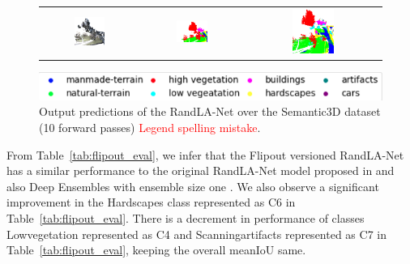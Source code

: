 \begin{figure}[h!]
\begin{tabular}{ccc}
            \includegraphics[width=0.33\textwidth, height=0.18\textheight]{images/seg_output/sem3d_seg_output/3_RGB.png} &
            \includegraphics[width=0.33\textwidth, height=0.18\textheight]{images/seg_output/sem3d_seg_output/3_GT.png}& 
            \includegraphics[width=0.33\textwidth, height=0.18\textheight]{images/seg_output/flipout/sem3d_3.png}\\
        \end{tabular}
        \includegraphics[scale=0.65]{images/legend.png}
        \caption{Output predictions of the RandLA-Net over the Semantic3D dataset (10 forward passes) \textcolor{red}{Legend spelling mistake}.}
        \label{fig:flipout_vis_sem3d}
    \end{figure}   

    From Table~\ref{tab:flipout_eval}, we infer that the Flipout versioned RandLA-Net has a similar performance to the original RandLA-Net model proposed in \cite{Hu_2020_CVPR_Randla} and also Deep Ensembles with ensemble size one .
    We also observe a significant improvement in the Hardscapes class represented as C6 in Table~\ref{tab:flipout_eval}.
    There is a decrement in performance of classes Lowvegetation represented as C4 and Scanningartifacts represented as C7 in Table~\ref{tab:flipout_eval}, keeping the overall meanIoU same.
    
